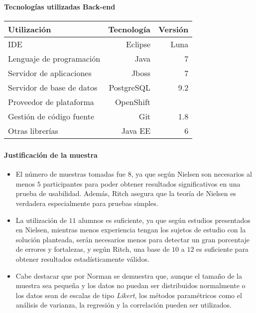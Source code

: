 \begin{frame}[noframenumbering]
\frametitle{\apendixframetitle}
\framesubtitle{Tecnologías utilizadas \- Back-end}
\begin{table}
\centering
\begin{tabular}{lrr}
\toprule
\textbf{Utilización} & \textbf{Tecnología}  & \textbf{Versión} \\
\midrule
IDE                         & Eclipse & Luna\\
Lenguaje de programación    & Java & 7\\
\midrule
Servidor de aplicaciones    & Jboss & 7 \\
Servidor de base de datos   & PostgreSQL & 9.2 \\
Proveedor de plataforma     & OpenShift \\
\midrule
Gestión de código fuente    & Git & 1.8\\
Otras librerías             & Java EE & 6\\

\bottomrule
\end{tabular}
\end{table}
\end{frame}

\begin{frame}[noframenumbering]
\frametitle{\apendixframetitle}
\framesubtitle{Justificación de la muestra}

\small

\begin{itemize}

\item El número de muestras tomadas fue 8, ya que según Nielsen son necesarios
    al menos $5$ participantes para poder obtener resultados significativos en
    una prueba de usabilidad. Además, Ritch asegura que la teoría de Nielsen es
    verdadera especialmente para pruebas simples. 

\item La utilización de $11$ alumnos es suficiente, ya que según estudios
    presentados en Nielsen, mientras menos experiencia tengan los sujetos de
    estudio con la solución planteada, serán necesarios menos para detectar un
    gran porcentaje de errores y fortalezas, y según Ritch, una base de $10$ a
    $12$ es suficiente para obtener resultados estadísticamente válidos.

\item Cabe destacar que por Norman se demuestra que, aunque el tamaño de la
    muestra sea pequeña y los datos no puedan ser distribuidos normalmente o los
    datos sean de escalas de tipo \textit{Likert}, los métodos paramétricos como
    el análisis de varianza, la regresión y la correlación pueden ser
    utilizados.

\end{itemize}
\end{frame}


